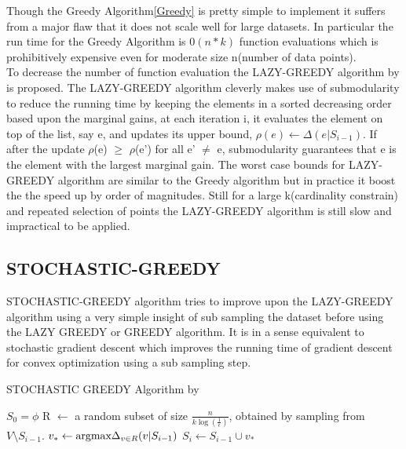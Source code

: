 \documentclass[a4paper,twoside]{iiththesis}
\theoremstyle{definition}
\theoremstyle{definition}
\theoremstyle{remark}
\begin{document}
Though the Greedy Algorithm\ref{Greedy} is pretty simple to implement it suffers from a major flaw that it does not scale well for large datasets. In particular the run time for the Greedy Algorithm is $0(n*k)$ function evaluations which is prohibitively expensive even for moderate size n(number of data points).\\
To decrease the number of function evaluation the LAZY-GREEDY algorithm by \cite{minoux1978accelerated} is proposed. The LAZY-GREEDY algorithm cleverly makes use of submodularity to reduce the running time by keeping the elements in a sorted decreasing order based upon the marginal gains, at each iteration i, it evaluates the element on top of the list, say e, and updates its upper bound, $\rho(e) \leftarrow \Delta(e|S_{i -1})$. If after the update $\rho$(e) $\geq$ $\rho$(e') for all e' $\neq$ e, submodularity guarantees that e is the element with the largest marginal gain. The worst case bounds for LAZY-GREEDY algorithm are similar to the Greedy algorithm but in practice it boost the the speed up by order of magnitudes. Still for a large k(cardinality constrain) and repeated selection of points the LAZY-GREEDY algorithm is still slow and impractical to be applied.

\subsection{STOCHASTIC-GREEDY} \label{lazier}

STOCHASTIC-GREEDY \cite{mirzasoleiman2015lazier} algorithm tries to improve upon the LAZY-GREEDY algorithm using a very simple insight of sub sampling the dataset before using the LAZY GREEDY or GREEDY algorithm. It is in a sense equivalent to stochastic gradient descent which improves the running time of gradient descent for convex optimization using a sub sampling step.
\
\begin{algorithm}
\caption{STOCHASTIC GREEDY Algorithm by \cite{mirzasoleiman2015lazier}}
\label{SGreedy}
\begin{algorithmic}[1]
\Ensure{subset $S_k \subseteq V$ of size k}
\State $S_0= {\phi}$ 
\State R $\leftarrow$ a random subset of size $\frac{n}{k\log(\frac{1}{\epsilon})}$, obtained by sampling from $V \setminus S_{i-1}$.
\State $ v_{*} \leftarrow \text{argmax}\space \space \Delta_{v\in R}(v| S_{i-1})$
\State $S_i \leftarrow S_{i-1} \cup {{v_*}}$
\EndFor
\end{algorithmic}
\end{algorithm}
\end{document}
